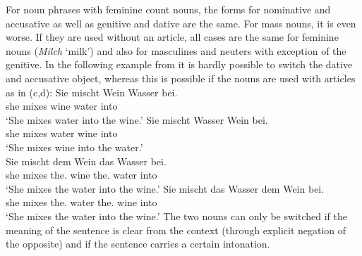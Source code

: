 For noun phrases with feminine count nouns, the forms for nominative and accusative as well as genitive and dative are the same.
For mass nouns, it is even worse. If they are used without an article, all cases are the same for feminine nouns (\eg \emph{Milch} `milk')
and also for masculines and neuters with exception of the genitive. In the following example from
\citet[]{Wegener85b} it is hardly possible to switch the dative and accusative object,
whereas this is possible if the nouns are used with articles as in (c,d): 
\eal
\ex 
\gll Sie mischt Wein Wasser bei.\\
     she mixes wine water into\\
\glt `She mixes water into the wine.'
\ex 
\gll Sie mischt Wasser Wein bei.\\
     she mixes water wine into\\
\glt `She mixes wine into the water.'\\
\ex 
\gll Sie mischt dem Wein das Wasser bei.\\
     she mixes the.\dat{} wine the.\acc{} water into\\
\glt `She mixes the water into the wine.'
\ex 
\gll Sie mischt das Wasser dem Wein bei.\\
	she mixes the.\acc{} water the.\dat{} wine into\\
\glt `She mixes the water into the wine.'
\zl
The two nouns can only be switched if the meaning of the sentence is clear from the context (\eg through explicit negation of the opposite)
and if the sentence carries a certain intonation.

